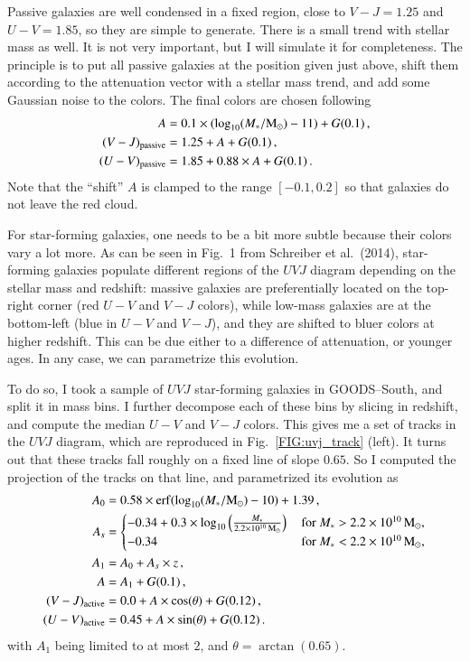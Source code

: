 \documentclass[12pt,a4paper]{article}
\newcommand{\rfig}[1]{Fig.~\ref{#1}}
\newcommand{\msun}{{\rm M}_\odot}
\newcommand{\mstar}{M_\ast}
\newcommand{\uvj}{$UVJ$\xspace}
\begin{document}
Passive galaxies are well condensed in a fixed region, close to $V-J = 1.25$ and $U-V = 1.85$, so they are simple to generate. There is a small trend with stellar mass as well. It is not very important, but I will simulate it for completeness. The principle is to put all passive galaxies at the position given just above, shift them according to the attenuation vector with a stellar mass trend, and add some Gaussian noise to the colors. The final colors are chosen following
\begin{align}
A &= 0.1 \times (\log_{10}(\mstar/\msun) - 11) + G(0.1)\,, \\
(V-J)_{\rm passive} &= 1.25 + A + G(0.1)\,, \\
(U-V)_{\rm passive} &= 1.85 + 0.88 \times A + G(0.1)\,.
\end{align}
Note that the ``shift'' $A$ is clamped to the range $[-0.1,0.2]$ so that galaxies do not leave the red cloud.

For star-forming galaxies, one needs to be a bit more subtle because their colors vary a lot more. As can be seen in Fig.~1 from Schreiber et al.~(2014), star-forming galaxies populate different regions of the \uvj diagram depending on the stellar mass and redshift: massive galaxies are preferentially located on the top-right corner (red $U-V$ and $V-J$ colors), while low-mass galaxies are at the bottom-left (blue in $U-V$ and $V-J$), and they are shifted to bluer colors at higher redshift. This can be due either to a difference of attenuation, or younger ages. In any case, we can parametrize this evolution.

To do so, I took a sample of \uvj star-forming galaxies in GOODS--South, and split it in mass bins. I further decompose each of these bins by slicing in redshift, and compute the median $U-V$ and $V-J$ colors. This gives me a set of tracks in the \uvj diagram, which are reproduced in \rfig{FIG:uvj_track} (left). It turns out that these tracks fall roughly on a fixed line of slope $0.65$. So I computed the projection of the tracks on that line, and parametrized its evolution as
\begin{align}
A_0 &= 0.58 \times {\rm erf}(\log_{10}(\mstar/\msun) - 10) + 1.39\,, \\
A_s &= \begin{cases}
-0.34 + 0.3 \times \log_{10}\left(\frac{\mstar}{2.2 \times 10^{10}\,\msun}\right)\,&\text{for $\mstar > 2.2 \times 10^{10}\,\msun$,} \\
-0.34\,&\text{for $\mstar < 2.2 \times 10^{10}\,\msun$,}
\end{cases} \\
A_1 &= A_0 + A_s \times z\,, \\
A &= A_1 + G(0.1)\,, \\
(V-J)_{\rm active} &= 0.0 + A \times \cos(\theta) + G(0.12)\,, \\
(U-V)_{\rm active} &= 0.45 + A \times \sin(\theta) + G(0.12)\,.
\end{align}
with $A_1$ being limited to at most $2$, and $\theta = \arctan(0.65)$.
\end{document}
